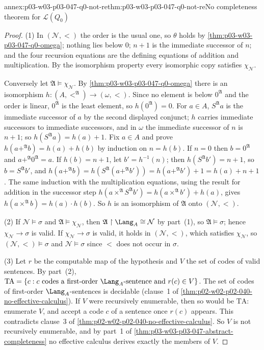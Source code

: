 \begin{annexitem}{annex:p03-w03-p03-047-q0-not-re}{thm:p03-w03-p03-047-q0-not-re}{No completeness theorem for \(\mathscr L(Q_0)\)}
\begin{proof}
(1) In \((\mathcal N,<)\) the order is the usual one, so \(\theta\) holds by
\cref{thm:p03-w03-p03-047-q0-omega}; nothing lies below \(0\); \(n+1\) is the
immediate successor of \(n\); and the four recursion equations are the
defining equations of addition and multiplication.  By the isomorphism
property every isomorphic copy satisfies \(\chi_{\mathcal N}\).

Conversely let \(\mathfrak A\models\chi_{\mathcal N}\).  By
\cref{thm:p03-w03-p03-047-q0-omega} there is an isomorphism
\(h:(A,<^{\mathfrak A})\to(\omega,<)\).  Since no element is below
\(0^{\mathfrak A}\) and the order is linear, \(0^{\mathfrak A}\) is the least
element, so \(h(0^{\mathfrak A})=0\).  For \(a\in A\), \(S^{\mathfrak A}a\) is
the immediate successor of \(a\) by the second displayed conjunct; \(h\)
carries immediate successors to immediate successors, and in \(\omega\) the
immediate successor of \(n\) is \(n+1\); so \(h(S^{\mathfrak A}a)=h(a)+1\).
Fix \(a\in A\) and prove \(h(a+^{\mathfrak A}b)=h(a)+h(b)\) by induction on
\(n=h(b)\).  If \(n=0\) then \(b=0^{\mathfrak A}\) and
\(a+^{\mathfrak A}0^{\mathfrak A}=a\).  If \(h(b)=n+1\), let
\(b'=h^{-1}(n)\); then \(h(S^{\mathfrak A}b')=n+1\), so
\(b=S^{\mathfrak A}b'\), and
\(h(a+^{\mathfrak A}b)=h(S^{\mathfrak A}(a+^{\mathfrak A}b'))=h(a+^{\mathfrak A}b')+1=h(a)+n+1\).
The same induction with the multiplication equations, using the result for
addition in the successor step
\(h(a\times^{\mathfrak A}S^{\mathfrak A}b')=h(a\times^{\mathfrak A}b')+h(a)\),
gives \(h(a\times^{\mathfrak A}b)=h(a)\cdot h(b)\).  So \(h\) is an
isomorphism of \(\mathfrak A\) onto \((\mathcal N,<)\).

(2) If \(\mathcal N\models\sigma\) and \(\mathfrak A\models\chi_{\mathcal N}\),
then \(\mathfrak A\restriction\Lang_A\cong\mathcal N\) by part~(1), so
\(\mathfrak A\models\sigma\); hence \(\chi_{\mathcal N}\to\sigma\) is valid.
If \(\chi_{\mathcal N}\to\sigma\) is valid, it holds in
\((\mathcal N,<)\), which satisfies \(\chi_{\mathcal N}\), so
\((\mathcal N,<)\models\sigma\) and \(\mathcal N\models\sigma\) since \(<\)
does not occur in \(\sigma\).

(3) Let \(r\) be the computable map of the hypothesis and \(V\) the set of
codes of valid sentences.  By part~(2), \(\mathrm{TA}=\{c:c\text{ codes a
first-order }\Lang_A\text{-sentence and }r(c)\in V\}\).  The set of codes of
first-order \(\Lang_A\)-sentences is decidable (clause~1 of
\cref{thm:p02-w02-p02-040-no-effective-calculus}).  If \(V\) were
recursively enumerable, then so would be \(\mathrm{TA}\): enumerate \(V\),
and accept a code \(c\) of a sentence once \(r(c)\) appears.  This
contradicts clause~3 of \cref{thm:p02-w02-p02-040-no-effective-calculus}.
So \(V\) is not recursively enumerable, and by part~1 of
\cref{thm:p03-w03-p03-047-abstract-completeness} no effective calculus
derives exactly the members of \(V\).
\end{proof}
\end{annexitem}

